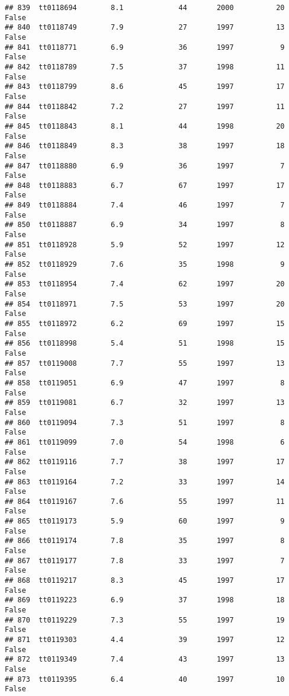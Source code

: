 \documentclass[
]{article}
\begin{document}
\begin{verbatim}
## 839  tt0118694        8.1             44       2000          20   False
## 840  tt0118749        7.9             27       1997          13   False
## 841  tt0118771        6.9             36       1997           9   False
## 842  tt0118789        7.5             37       1998          11   False
## 843  tt0118799        8.6             45       1997          17   False
## 844  tt0118842        7.2             27       1997          11   False
## 845  tt0118843        8.1             44       1998          20   False
## 846  tt0118849        8.3             38       1997          18   False
## 847  tt0118880        6.9             36       1997           7   False
## 848  tt0118883        6.7             67       1997          17   False
## 849  tt0118884        7.4             46       1997           7   False
## 850  tt0118887        6.9             34       1997           8   False
## 851  tt0118928        5.9             52       1997          12   False
## 852  tt0118929        7.6             35       1998           9   False
## 853  tt0118954        7.4             62       1997          20   False
## 854  tt0118971        7.5             53       1997          20   False
## 855  tt0118972        6.2             69       1997          15   False
## 856  tt0118998        5.4             51       1998          15   False
## 857  tt0119008        7.7             55       1997          13   False
## 858  tt0119051        6.9             47       1997           8   False
## 859  tt0119081        6.7             32       1997          13   False
## 860  tt0119094        7.3             51       1997           8   False
## 861  tt0119099        7.0             54       1998           6   False
## 862  tt0119116        7.7             38       1997          17   False
## 863  tt0119164        7.2             33       1997          14   False
## 864  tt0119167        7.6             55       1997          11   False
## 865  tt0119173        5.9             60       1997           9   False
## 866  tt0119174        7.8             35       1997           8   False
## 867  tt0119177        7.8             33       1997           7   False
## 868  tt0119217        8.3             45       1997          17   False
## 869  tt0119223        6.9             37       1998          18   False
## 870  tt0119229        7.3             55       1997          19   False
## 871  tt0119303        4.4             39       1997          12   False
## 872  tt0119349        7.4             43       1997          13   False
## 873  tt0119395        6.4             40       1997          10   False

\end{verbatim}
\end{document}

